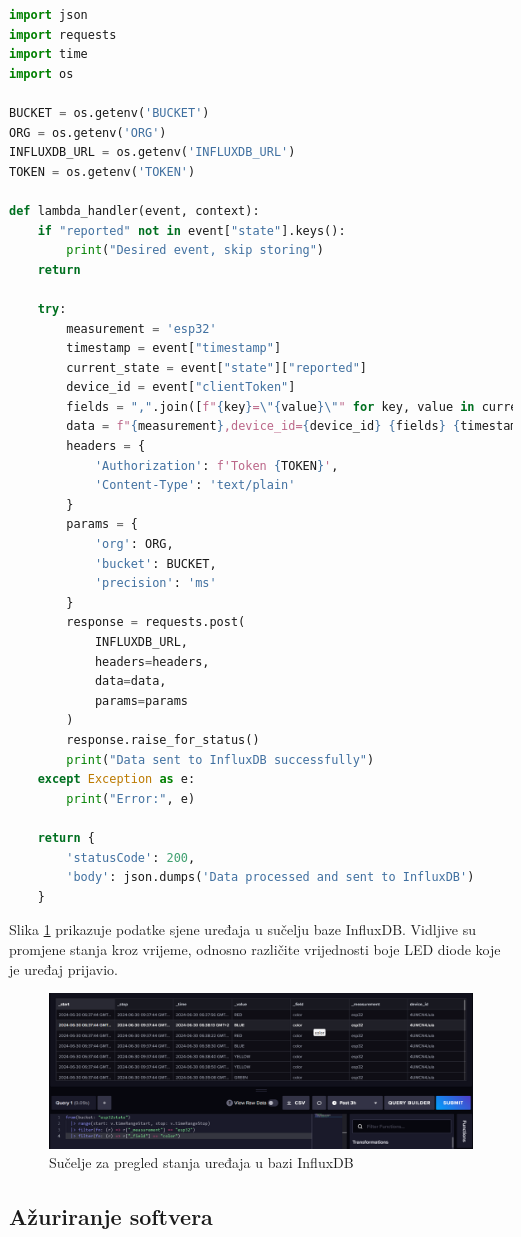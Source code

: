 \begin{lstlisting}[caption={Lambda funkcija za preusmjeravanje poruka sjene uređaja}, language=python]
import json
import requests
import time
import os

BUCKET = os.getenv('BUCKET')
ORG = os.getenv('ORG')
INFLUXDB_URL = os.getenv('INFLUXDB_URL')
TOKEN = os.getenv('TOKEN')

def lambda_handler(event, context):
	if "reported" not in event["state"].keys():
		print("Desired event, skip storing")
	return
	
	try:
		measurement = 'esp32'
		timestamp = event["timestamp"]
		current_state = event["state"]["reported"]
		device_id = event["clientToken"]
		fields = ",".join([f"{key}=\"{value}\"" for key, value in current_state.items() if key != "timestamp" and key != "clientToken"])
		data = f"{measurement},device_id={device_id} {fields} {timestamp * 1000}"
		headers = {
			'Authorization': f'Token {TOKEN}',
			'Content-Type': 'text/plain'
		}
		params = {
			'org': ORG,
			'bucket': BUCKET,
			'precision': 'ms'
		}
		response = requests.post(
			INFLUXDB_URL,
			headers=headers,
			data=data,
			params=params
		)
		response.raise_for_status()
		print("Data sent to InfluxDB successfully")
	except Exception as e:
		print("Error:", e)
	
	return {
		'statusCode': 200,
		'body': json.dumps('Data processed and sent to InfluxDB')
	}
\end{lstlisting}

Slika \ref{fig:influxdb_state} prikazuje podatke sjene uređaja u sučelju baze InfluxDB. Vidljive su promjene stanja kroz vrijeme, odnosno različite vrijednosti boje LED diode koje je uređaj prijavio. 

\begin{figure}[ht]
	\centering
	\includegraphics[scale=0.4]{imgs/influxdb_state}
	\caption{Sučelje za pregled stanja uređaja u bazi InfluxDB}
	\label{fig:influxdb_state}
\end{figure}

\subsection{Ažuriranje softvera}

